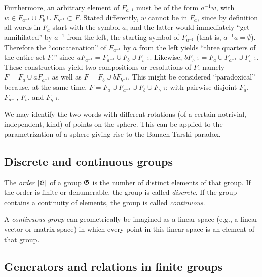 {\begin{itemize}
Furthermore,
an arbitrary element of $F_{a^{-1}}$ must be of the form
$a^{-1}w$, with $w \in F_{a^{-1}} \cup F_b \cup F_{b^{-1}}\subset F$.
Stated differently,
$w$ cannot be in $F_a$, since by definition all words in $F_a$ start with the
symbol $a$, and the latter
would immediately ``get annihilated'' by $a^{-1}$ from the left,
the starting symbol of $F_{a^{-1}}$ (that is, $a^{-1}a=\emptyset$).
Therefore the ``concatenation''
of $F_{a^{-1}}$ by $a$ from the left yields
``three quarters of the entire set $F$,''
since
$aF_{a^{-1}} = F_{a^{-1}}\cup F_b \cup F_{b^{-1}}$.
Likewise,
$bF_{b^{-1}} = F_a \cup F_{a^{-1}}\cup  F_{b^{-1}}$.
These constructions yield two
compositions or resolutions of $F$; namely
$F= F_a \cup a F_{a^{-1}}$
as well as
$F= F_b \cup b F_{b^{-1}}$.
This might be considered ``paradoxical''
because, at the same time,
$F= F_a \cup  F_{a^{-1}} \cup F_b \cup F_{b^{-1}}$;
with pairwise disjoint  $F_a$,
$F_{a^{-1}}$,
$F_b$, and
$F_{b^{-1}}$.

We may identify the two words with different rotations (of a certain notrivial, independent, kind\cite{Hausdorff1914})
of points on the sphere.
This can be applied to the parametrization of
a sphere giving rise to the Banach-Tarski paradox.\cite{wagon1}


\end{itemize}

\eexample
}


\subsection{Discrete and continuous groups}

The {\em order} $\vert {\frak G} \vert$ of a group ${\frak G}$ is the number of distinct elements of that group.
If the order is finite or denumerable, the group is called {\em discrete}.
If the group contains a continuity of elements, the group is called {\em continuous}.

A {\em continuous group} can geometrically be imagined as a linear  space  (e.g., a linear vector or matrix space)
in which every point in this linear space is an element of that group.




\subsection{Generators and relations in finite groups}



